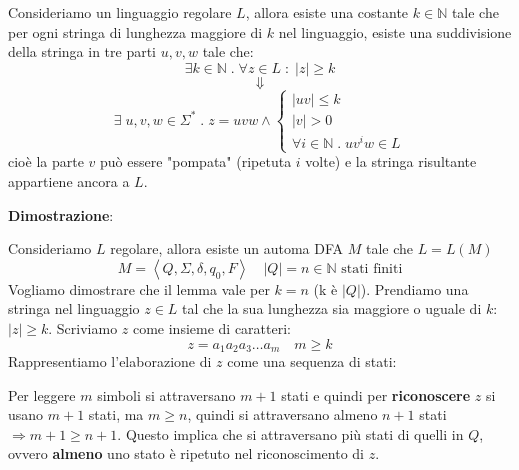 \documentclass[a4paper]{article}
\begin{document}
\begin{theorem}
  Consideriamo un linguaggio regolare \( L \), allora esiste una costante
  \( k \in \mathbb{N} \) tale che per ogni stringa di lunghezza maggiore di \( k \) nel
  linguaggio, esiste una suddivisione della stringa in tre parti \( u,v,w \) tale che:
  \[
    \exists k \in \mathbb{N} \;.\; \forall z \in L \;:\; |z| \ge k
  \] 
  \[
    \Downarrow
  \] 
  \[
    \exists\;
    u,v,w \in \Sigma^* \;.\;
    z = uvw \wedge \begin{cases}
      |uv| \le k\\
      |v| > 0\\
      \forall i \in \mathbb{N} \;.\; uv^iw \in L
    \end{cases}
  \] 
  cioè la parte \( v \) può essere "pompata" (ripetuta \( i \) volte) e la stringa
  risultante appartiene ancora a \( L \).

  \vspace{1em}
  \noindent
  \textbf{Dimostrazione}:

  \noindent
  Consideriamo \( L \) regolare, allora esiste un automa DFA \( M \) tale che \( L = L(M) \) 
  \[
    M = \left< Q, \Sigma, \delta, q_0, F \right> \quad |Q| = n \in \mathbb{N} \text{ stati finiti}
  \] 
  Vogliamo dimostrare che il lemma vale per \( k = n \) (k è \( |Q| \)). Prendiamo
  una stringa nel linguaggio \( z \in L \) tal che la sua lunghezza sia maggiore o
  uguale di \( k \): \( |z| \ge k \). Scriviamo \( z \) come insieme di caratteri:
  \[
    z = a_1 a_2 a_3 \ldots a_{m} \quad m \ge k
  \] 
  Rappresentiamo l'elaborazione di \( z \) come una sequenza di stati:
  \begin{figure}[H]
    \centering
  \end{figure}
  \noindent
  Per leggere \( m \) simboli si attraversano \( m+1 \) stati e quindi per
  \textbf{riconoscere} \( z \) si usano \( m+1 \) stati, ma \( m \ge n \),
  quindi si attraversano almeno \( n+1 \) stati \( \Rightarrow m+1 \ge n+1 \).
  Questo implica che si attraversano più stati di quelli in \( Q \), ovvero \textbf{almeno}
  uno stato è ripetuto nel riconoscimento di \( z \).
  

\end{theorem}
\end{document}
